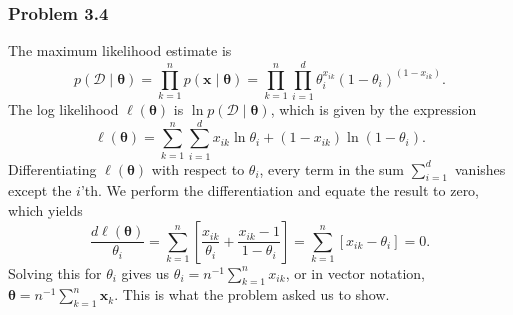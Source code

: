 \documentclass[12pt, a4paper]{article}
\newcommand{\D}{\mathcal{D}}
\newcommand{\vect}[1]{\bm{#1}}
\begin{document}
\subsubsection*{Problem 3.4}
The maximum likelihood estimate is 
\begin{equation*}
	p( \D  \mid  \vect{\theta}) = \prod_{k = 1}^{n} p( \vect{x}  \mid  \vect{\theta}) = \prod_{k = 1}^{n} \prod_{i=1}^{d}
	\theta_{i}^{x_{ik}} \left( 1 - \theta_i \right)^{\left(  1 - x_{ik} \right)}.
\end{equation*}
 The log likelihood $\ell(\vect{\theta})$ is $ \ln p( \D  \mid  \vect{\theta}) $, which is given by the expression
 \begin{equation*}
 	\ell(\vect{\theta}) = \sum_{k = 1}^{n} \sum_{i=1}^{d}
 	x_{ik} \ln \theta_i + (1 - x_{ik}) \ln \left( 1 - \theta_i\right).
 \end{equation*}
Differentiating $\ell(\vect{\theta})$ with respect to $\theta_i$, every term in the sum $\sum_{i=1}^{d}$ vanishes except the $i$'th.
We perform the differentiation and equate the result to zero, which yields
\begin{equation*}
	\frac{d \ell(\vect{\theta})}{\theta_i} = \sum_{k=1}^{n} \left[ \frac{x_{ik}}{\theta_i} + \frac{x_{ik} - 1}{1 - \theta_i} \right] =
	 \sum_{k=1}^{n} \left[ x_{ik} - \theta_i \right] = 0.
\end{equation*}
Solving this for $\theta_i$ gives us $\theta_i = n^{-1} \sum_{k=1}^{n} x_{ik}$, or in vector notation, $\vect{\theta} = n^{-1} \sum_{k=1}^{n} \vect{x}_k$.
This is what the problem asked us to show.
\end{document}
